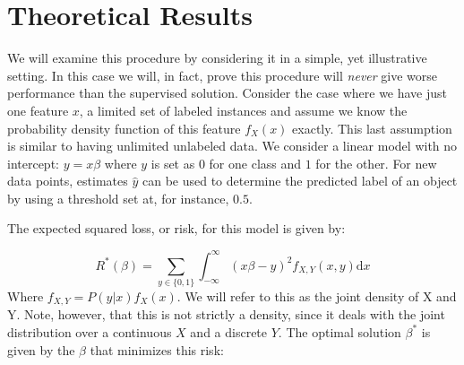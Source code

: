 \documentclass{llncs}
\newcommand{\Nunl}{U}
\newcommand{\Xe}{\mathbf{X}_e  }
\newcommand{\G}{\left(\Xe^T \Xe \right)^{-1}}
\begin{document}

\section{Theoretical Results}
\label{section:theoreticalresults}
We will examine this procedure by considering it in a simple, yet illustrative setting. In this case we will, in fact, prove this procedure will \emph{never} give worse performance than the supervised solution.
Consider the case where we have just one feature $x$, a limited set of labeled instances and assume we know the probability density function of this feature $f_X(x)$ exactly. 
This last assumption is similar to having unlimited unlabeled data. %
We consider a linear model with no intercept: $y = x \beta$ where $y$ is set as $0$ for one class and $1$ for the other. 
For new data points, estimates $\hat{y}$ can be used to determine the predicted label of an object by using a threshold set at, for instance, $0.5$.

The expected squared loss, or risk, for this model is given by:

\begin{equation} \label{eq:trueloss}
R^*(\beta) = \sum_{y \in \{0,1\}}{ \int_{-\infty}^{\infty}(x \beta - y)^2  f_{X,Y}(x,y)  \mathrm{d}x}
\end{equation}
Where $f_{X,Y}=P(y|x) f_X(x)$. We will refer to this as the joint density of X and Y. Note, however, that this is not strictly a density, since it deals with the joint distribution over a continuous $X$ and a discrete $Y$. The optimal solution $\beta^*$ is given by the $\beta$ that minimizes this risk:
\end{document}
